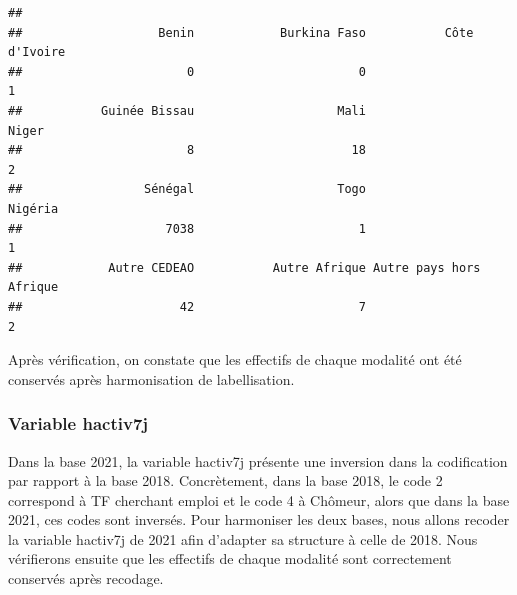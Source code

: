 \documentclass[
]{article}
\newenvironment{Shaded}{\begin{snugshade}}{\end{snugshade}}
\newcommand{\CommentTok}[1]{\textcolor[rgb]{0.56,0.35,0.01}{\textit{#1}}}
\newcommand{\FunctionTok}[1]{\textcolor[rgb]{0.13,0.29,0.53}{\textbf{#1}}}
\newcommand{\NormalTok}[1]{#1}
\newcommand{\OtherTok}[1]{\textcolor[rgb]{0.56,0.35,0.01}{#1}}
\newcommand{\SpecialCharTok}[1]{\textcolor[rgb]{0.81,0.36,0.00}{\textbf{#1}}}
\begin{document}
\begin{Shaded}
\end{Shaded}

\begin{verbatim}
## 
##                   Benin            Burkina Faso           Côte d'Ivoire 
##                       0                       0                       1 
##           Guinée Bissau                    Mali                   Niger 
##                       8                      18                       2 
##                 Sénégal                    Togo                 Nigéria 
##                    7038                       1                       1 
##            Autre CEDEAO           Autre Afrique Autre pays hors Afrique 
##                      42                       7                       2
\end{verbatim}

Après vérification, on constate que les effectifs de chaque modalité ont
été conservés après harmonisation de labellisation.

\hypertarget{variable-hactiv7j}{%
\subsubsection{Variable hactiv7j}\label{variable-hactiv7j}}

Dans la base 2021, la variable hactiv7j présente une inversion dans la
codification par rapport à la base 2018. Concrètement, dans la base
2018, le code 2 correspond à TF cherchant emploi et le code 4 à Chômeur,
alors que dans la base 2021, ces codes sont inversés. Pour harmoniser
les deux bases, nous allons recoder la variable hactiv7j de 2021 afin
d'adapter sa structure à celle de 2018. Nous vérifierons ensuite que les
effectifs de chaque modalité sont correctement conservés après recodage.

\begin{Shaded}
\end{Shaded}
\end{document}
